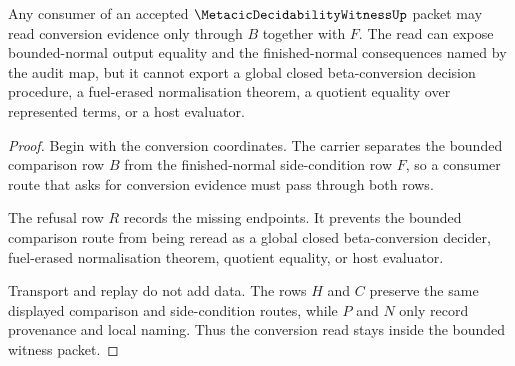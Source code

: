 \begin{theorem}
\label{thm:metacic-decidability-witness-bounded-conversion-nonescape}
Any consumer of an accepted $\MetacicDecidabilityWitnessUp$ packet may read conversion evidence only through $B$ together with $F$. The read can expose bounded-normal output equality and the finished-normal consequences named by the audit map, but it cannot export a global closed beta-conversion decision procedure, a fuel-erased normalisation theorem, a quotient equality over represented terms, or a host evaluator.
\end{theorem}
\begin{proof}
Begin with the conversion coordinates. The carrier separates the bounded comparison row $B$ from the finished-normal side-condition row $F$, so a consumer route that asks for conversion evidence must pass through both rows.

The refusal row $R$ records the missing endpoints. It prevents the bounded comparison route from being reread as a global closed beta-conversion decider, fuel-erased normalisation theorem, quotient equality, or host evaluator.

Transport and replay do not add data. The rows $H$ and $C$ preserve the same displayed comparison and side-condition routes, while $P$ and $N$ only record provenance and local naming. Thus the conversion read stays inside the bounded witness packet.
\end{proof}

